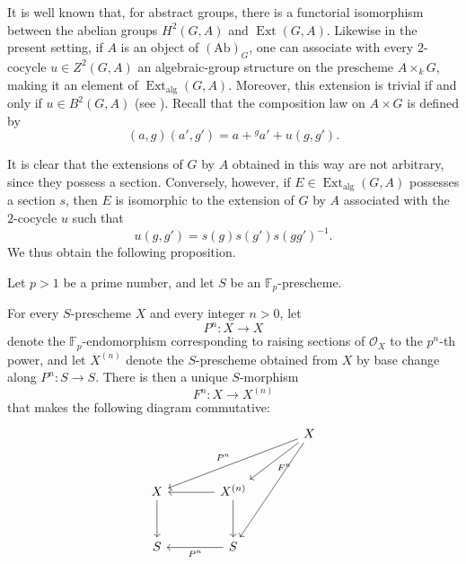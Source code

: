 It is well known that, for abstract groups, there is a functorial
isomorphism between the abelian groups \(H^2(G,A)\) and
\(\operatorname{Ext}(G,A)\).  Likewise in the present setting,
if \(A\) is an object of \((\mathrm{Ab})_G\), one can associate
with every \(2\)-cocycle \(u\in Z^2(G,A)\) an algebraic-group
structure on the prescheme \(A\times_kG\), making it an element
of \(\operatorname{Ext}_{\mathrm{alg}}(G,A)\).  Moreover, this
extension is trivial if and only if \(u\in B^2(G,A)\) (see
).  Recall that the composition law on
\(A\times G\) is defined by
\[
  (a,g)(a',g')=a+{}^g a'+u(g,g').
\]

It is clear that the extensions of \(G\) by \(A\) obtained in
this way are not arbitrary, since they possess a section.
Conversely, however, if
\(E\in\operatorname{Ext}_{\mathrm{alg}}(G,A)\) possesses a
section \(s\), then \(E\) is isomorphic to the extension of
\(G\) by \(A\) associated with the \(2\)-cocycle \(u\) such that
\[
  u(g,g')=s(g)s(g')s(gg')^{-1}.
\]
We thus obtain the following proposition.



Let \(p>1\) be a prime number, and let \(S\) be an
\(\mathbb F_p\)-prescheme.



For every \(S\)-prescheme \(X\) and every integer \(n>0\), let
\[
  P^n:X\longrightarrow X
\]
denote the \(\mathbb F_p\)-endomorphism corresponding to raising
sections of \(\mathcal O_X\) to the \(p^n\)-th power, and let
\(X^{(n)}\) denote the \(S\)-prescheme obtained from \(X\) by base
change along \(P^n:S\to S\).  There is then a unique
\(S\)-morphism
\[
  F^n:X\longrightarrow X^{(n)}
\]
that makes the following diagram commutative:
\[
\begin{tikzcd}[column sep=3.7em,row sep=3.0em]
  {} & {} & X
    \arrow[dll,"P^n"']
    \arrow[dl,"F^n"]
    \arrow[ddl] \\
  X \arrow[d] &
  X^{(n)} \arrow[l] \arrow[d] &
  {} \\
  S &
  S \arrow[l,"P^n"] &
  {}
\end{tikzcd}
\]

